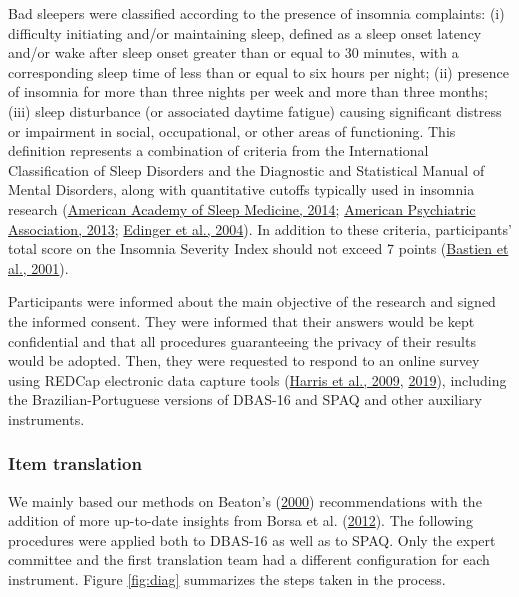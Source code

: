 \documentclass[
  ,doc,11pt, twoside,floatsintext]{apa6}
\begin{document}
Bad sleepers were classified according to the presence of insomnia complaints: (i) difficulty initiating and/or maintaining sleep, defined as a sleep onset latency and/or wake after sleep onset greater than or equal to 30 minutes, with a corresponding sleep time of less than or equal to six hours per night; (ii) presence of insomnia for more than three nights per week and more than three months; (iii) sleep disturbance (or associated daytime fatigue) causing significant distress or impairment in social, occupational, or other areas of functioning. This definition represents a combination of criteria from the International Classification of Sleep Disorders and the Diagnostic and Statistical Manual of Mental Disorders, along with quantitative cutoffs typically used in insomnia research (\protect\hyperlink{ref-icds2014}{American Academy of Sleep Medicine, 2014}; \protect\hyperlink{ref-americanpsychiatricassociation2013}{American Psychiatric Association, 2013}; \protect\hyperlink{ref-edinger2004}{Edinger et al., 2004}). In addition to these criteria, participants' total score on the Insomnia Severity Index should not exceed 7 points (\protect\hyperlink{ref-bastien2001}{Bastien et al., 2001}).

Participants were informed about the main objective of the research and signed the informed consent. They were informed that their answers would be kept confidential and that all procedures guaranteeing the privacy of their results would be adopted. Then, they were requested to respond to an online survey using REDCap electronic data capture tools (\protect\hyperlink{ref-harris2009research}{Harris et al., 2009}, \protect\hyperlink{ref-harris2019redcap}{2019}), including the Brazilian-Portuguese versions of DBAS-16 and SPAQ and other auxiliary instruments.

\hypertarget{item-translation}{%
\subsubsection{Item translation}\label{item-translation}}

We mainly based our methods on Beaton's (\protect\hyperlink{ref-beaton2000}{2000}) recommendations with the addition of more up-to-date insights from Borsa et al. (\protect\hyperlink{ref-borsaAdaptacaoValidacaoInstrumentos2012}{2012}). The following procedures were applied both to DBAS-16 as well as to SPAQ. Only the expert committee and the first translation team had a different configuration for each instrument.
Figure \ref{fig:diag} summarizes the steps taken in the process.
\end{document}
